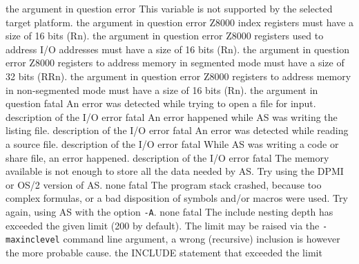 \documentclass[12pt,twoside]{report}
\newcommand{\tty}[1]{{\tt #1}}
\begin{document}
\begin{description}
               {the argument in question}
               {error}
               {This variable is not supported by the selected target platform.}
               {the argument in question}
               {error}
               {Z8000 index registers must have a size of 16 bits (Rn).}
               {the argument in question}
               {error}
               {Z8000 registers used to address I/O addresses must have a size of 16 bits (Rn).}
               {the argument in question}
               {error}
               {Z8000 registers to address memory in segmented mode must have a size of 32 bits (RRn).}
               {the argument in question}
               {error}
               {Z8000 registers to address memory in non-segmented mode must have a size of 16 bits (Rn).}
               {the argument in question}
               {fatal}
               {An error was detected while trying to open a file for input.}
               {description of the I/O error}
               {fatal}
               {An error happened while AS was writing the listing file.}
               {description of the I/O error}
               {fatal}
               {An error was detected while reading a source file.}
               {description of the I/O error}
               {fatal}
               {While AS was writing a code or share file, an error happened.}
               {description of the I/O error}
               {fatal}
               {The memory available is not enough to store all the data
                needed by AS. Try using the DPMI or OS/2 version of AS.}
               {none}
               {fatal}
               {The program stack crashed, because too complex formulas, or
                a bad disposition of symbols and/or macros were used. Try
                again, using AS with the option \tty{-A}.}
               {none}
               {fatal}
               {The include nesting depth has exceeded the given limit (200
                by default). The limit may be raised via the {\tt -maxinclevel}
                command line argument, a wrong (recursive) inclusion is however
                the more probable cause.}
               {the INCLUDE statement that exceeded the limit}
\end{description}
\end{document}
